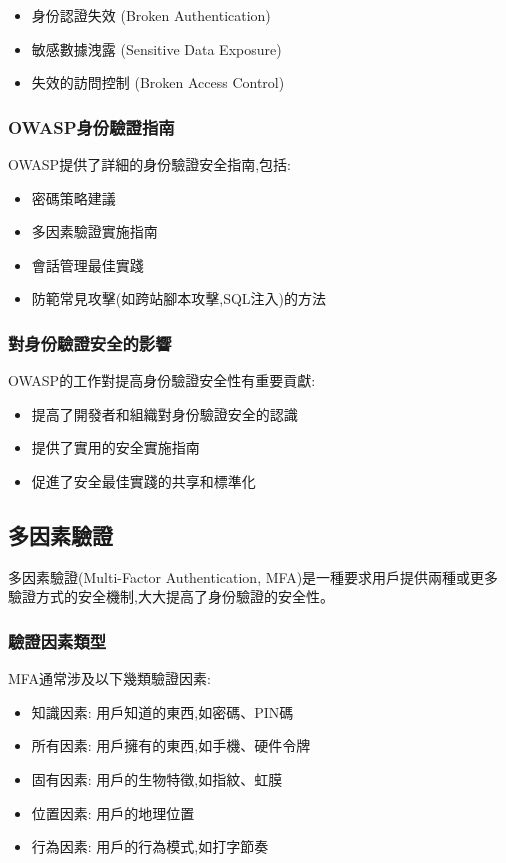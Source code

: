 \begin{itemize}
  \item 身份認證失效 (Broken Authentication)
  \item 敏感數據洩露 (Sensitive Data Exposure)
  \item 失效的訪問控制 (Broken Access Control)
\end{itemize}

\subsubsection{OWASP身份驗證指南}
OWASP提供了詳細的身份驗證安全指南,包括:

\begin{itemize}
  \item 密碼策略建議
  \item 多因素驗證實施指南
  \item 會話管理最佳實踐
  \item 防範常見攻擊(如跨站腳本攻擊,SQL注入)的方法
\end{itemize}

\subsubsection{對身份驗證安全的影響}
OWASP的工作對提高身份驗證安全性有重要貢獻:
\begin{itemize}
  \item 提高了開發者和組織對身份驗證安全的認識
  \item 提供了實用的安全實施指南
  \item 促進了安全最佳實踐的共享和標準化
\end{itemize}

\subsection{多因素驗證}
多因素驗證(Multi-Factor Authentication, MFA)是一種要求用戶提供兩種或更多驗證方式的安全機制,大大提高了身份驗證的安全性。

\subsubsection{驗證因素類型}
MFA通常涉及以下幾類驗證因素:
\begin{itemize}
  \item 知識因素: 用戶知道的東西,如密碼、PIN碼
  \item 所有因素: 用戶擁有的東西,如手機、硬件令牌
  \item 固有因素: 用戶的生物特徵,如指紋、虹膜
  \item 位置因素: 用戶的地理位置
  \item 行為因素: 用戶的行為模式,如打字節奏
\end{itemize}
